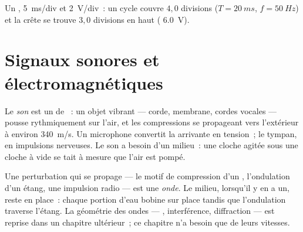 \begin{omfigure}

{\small Un , 
\qty{5}{ms}/div et  \qty{2}{V}/div~: un cycle couvre
$4{,}0$ divisions ($T = \qty{20}{ms}$, $f = \qty{50}{Hz}$) et la crête
se trouve $3{,}0$ divisions en haut (
\qty{6.0}{V}).}
\end{omfigure}

\section{Signaux sonores et électromagnétiques}

\begin{definition}[Son]\label{def:g10:signals-and-waves:sound}
Le \emph{son} est un  de
~: un objet vibrant --- corde, membrane, cordes
vocales --- pousse rythmiquement sur l'air, et les compressions se
propageant vers l'extérieur à environ \qty{340}{m/s}. Un microphone
convertit la  arrivante en tension~; le tympan, en
impulsions nerveuses. Le son a besoin d'un milieu~: une cloche agitée
sous une cloche à vide se tait à mesure que l'air est pompé.
\end{definition}

\begin{definition}[Onde]\label{def:g10:signals-and-waves:wave}
Une perturbation qui se propage --- le motif de compression d'un
, l'ondulation d'un étang, une impulsion radio --- est une
\emph{onde}. Le milieu, lorsqu'il y en a un, reste en place~:
chaque portion d'eau bobine sur place tandis que l'ondulation traverse
l'étang. La géométrie des ondes --- ,
interférence, diffraction --- est reprise dans un chapitre ultérieur~;
ce chapitre n'a besoin que de leurs vitesses.
\end{definition}

